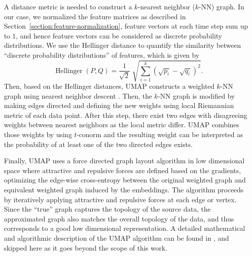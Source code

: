 A distance metric is needed to construct a $k$-nearest neighbor ($k$-NN) graph.
In our case, we normalized the feature matrices as described in Section~\ref{section:feature-normalization}, feature vectors at each time step sum up to $1$, and hence feature vectors can be considered as discrete probability distributions.
We use the Hellinger distance \citep{hellinger_neue_1909} to quantify the similarity between ``discrete probability distributions'' of features, which is given by
\begin{equation}
	\operatorname{Hellinger}(P,Q)={\frac {1}{\sqrt {2}}}\;{\sqrt {\sum _{i=1}^{k}({\sqrt {p_{i}}}-{\sqrt {q_{i}}})^{2}}}.
\end{equation}
Then, based on the Hellinger distances, UMAP constructs a weighted $k$-NN graph using nearest neighbor descent \citep{dong_efficient_2011}.
Then, the $k$-NN graph is modified by making edges directed and defining the new weights using local Riemannian metric of each data point.
After this step, there exist two edges with disagreeing weights between nearest neighbors as the local metric differ.
UMAP combines those weights by using $t$-conorm and the resulting weight can be interpreted as the probability of at least one of the two directed edges exists.

Finally, UMAP uses a force directed graph layout algorithm in low dimensional space where attractive and repulsive forces are defined based on the gradients, optimizing the edge-wise cross-entropy between the original weighted graph and equivalent weighted graph induced by the embeddings.
The algorithm proceeds by iteratively applying attractive and repulsive forces at each edge or vertex.
Since the ``true'' graph captures the topology of the source data, the approximated graph also matches the overall topology of the data, and thus corresponds to a good low dimensional representation.
A detailed mathematical and algorithmic description of the UMAP algorithm can be found in \citep{mcinnes_umap_2020}, and skipped here as it goes beyond the scope of this work.

\begin{comment}
\begin{algorithm}[!htbp]
	\caption{The main UMAP algorithm.}\label{alg:umap}
	\begin{algorithmic}[0]
		\setlength\baselineskip{18pt}
		\Function{UMAP}{$X$, $n$, $d$, min-dist, n-epochs}
		\State
		\State \# \textit{Construct the relevant weighted graph}
		\ForAll{$x \in X$}
		\State fs-set[$x$] $\gets$ \Call{LocalFuzzySimplicialSet}{$X$, $x$, $n$}
		\EndFor
		\State top-rep $\gets \bigcup_{x\in X} \textrm{fs-set}[x]$ \Comment{The probabilistic t-conorm is recommended.}
		\State
		\State \# \textit{Perform optimization of the graph layout}
		\State $Y \gets$ \Call{SpectralEmbedding}{top-rep, $d$}
		\State $Y \gets$ \Call{OptimizeEmbedding}{top-rep, $Y$, min-dist, n-epochs}
		\State \Return $Y$
		\EndFunction\vskip9pt
	\end{algorithmic}
\end{algorithm}
\end{comment}

